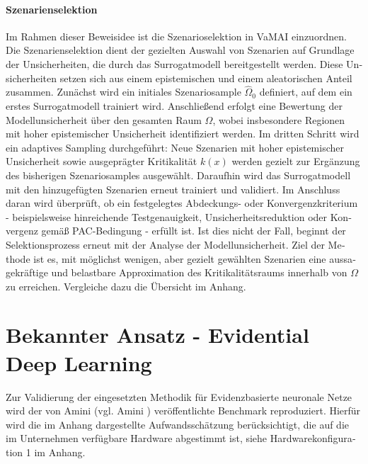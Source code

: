 \begin{otherlanguage}{ngerman}
\begin{enumerate}
\end{enumerate}

\paragraph{Szenarienselektion} Im Rahmen dieser Beweisidee ist die Szenarioselektion in VaMAI einzuordnen. Die Szenarienselektion dient der gezielten Auswahl von Szenarien auf Grundlage der Unsicherheiten, die durch das Surrogatmodell bereitgestellt werden. Diese Unsicherheiten setzen sich aus einem epistemischen und einem aleatorischen Anteil zusammen. Zunächst wird ein initiales Szenariosample $\widehat{\Omega}_0$ definiert, auf dem ein erstes Surrogatmodell trainiert wird. Anschließend erfolgt eine Bewertung der Modellunsicherheit über den gesamten Raum $\Omega$, wobei insbesondere Regionen mit hoher epistemischer Unsicherheit identifiziert werden. Im dritten Schritt wird ein adaptives Sampling durchgeführt: Neue Szenarien mit hoher epistemischer Unsicherheit sowie ausgeprägter Kritikalität $k(x)$ werden gezielt zur Ergänzung des bisherigen Szenariosamples ausgewählt. Daraufhin wird das Surrogatmodell mit den hinzugefügten Szenarien erneut trainiert und validiert. Im Anschluss daran wird überprüft, ob ein festgelegtes Abdeckungs- oder Konvergenzkriterium - beispielsweise hinreichende Testgenauigkeit, Unsicherheitsreduktion oder Konvergenz gemäß PAC-Bedingung - erfüllt ist. Ist dies nicht der Fall, beginnt der Selektionsprozess erneut mit der Analyse der Modellunsicherheit. Ziel der Methode ist es, mit möglichst wenigen, aber gezielt gewählten Szenarien eine aussagekräftige und belastbare Approximation des Kritikalitätsraums innerhalb von $\Omega$ zu erreichen. Vergleiche dazu die Übersicht im Anhang.



\section*{Bekannter Ansatz - Evidential Deep Learning}

Zur Validierung der eingesetzten Methodik für \gls{Evidenzbasierte neuronale Netze} wird der von Amini (vgl. Amini \parencite{amini2020deep}) veröffentlichte Benchmark reproduziert. Hierfür wird die im Anhang dargestellte Aufwandsschätzung berücksichtigt, die auf die im Unternehmen verfügbare Hardware abgestimmt ist, siehe Hardwarekonfiguration 1 im Anhang.


\end{otherlanguage}
